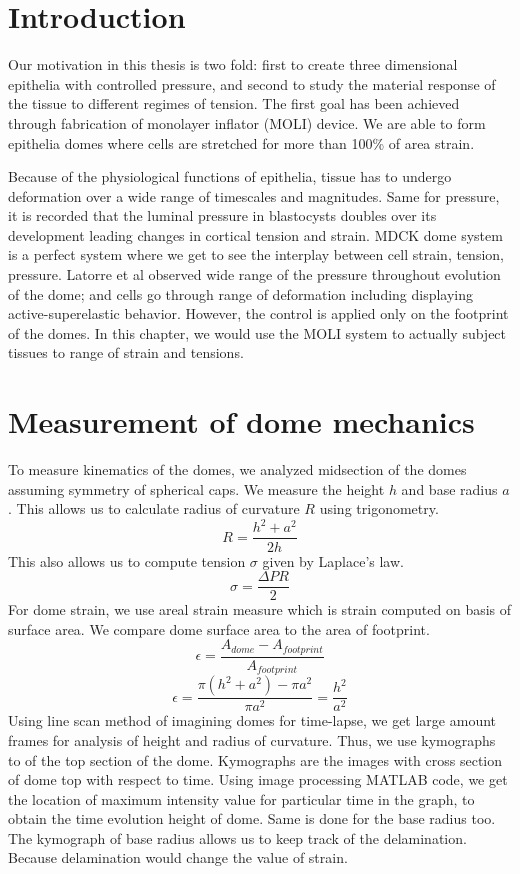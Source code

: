 \hypertarget{introduction}{%
\section{Introduction}\label{introduction2}}

Our motivation in this thesis is two fold: first to create three
dimensional epithelia with controlled pressure, and second to study the
material response of the tissue to different regimes of tension. The
first goal has been achieved through fabrication of monolayer inflator
(MOLI) device. We are able to form epithelia domes where cells are
stretched for more than 100\% of area strain.

Because of the physiological functions of epithelia, tissue has to
undergo deformation over a wide range of timescales and magnitudes. Same
for pressure, it is recorded that the luminal pressure in blastocysts
doubles over its development leading changes in cortical tension and
strain. MDCK dome system is a perfect system where we get to see the
interplay between cell strain, tension, pressure. Latorre et al observed
wide range of the pressure throughout evolution of the dome; and cells
go through range of deformation including displaying active-superelastic
behavior. However, the control is applied only on the footprint of the
domes. In this chapter, we would use the MOLI system to actually subject
tissues to range of strain and tensions.

\hypertarget{measurement-of-dome-mechanics}{%
\section{Measurement of dome
mechanics}\label{measurement-of-dome-mechanics}}

To measure kinematics of the domes, we analyzed midsection of the domes
assuming symmetry of spherical caps. We measure the height \(h\) and
base radius \(a\). This allows us to calculate radius of curvature \(R\)
using trigonometry. \[ R = \frac{h^2 + a^2}{2h} \] This also allows us
to compute tension \(\sigma\) given by Laplace's law.
\[\sigma = \frac{\Delta PR }{2}\] For dome strain, we use areal strain
measure which is strain computed on basis of surface area. We compare
dome surface area to the area of footprint.
\[ \epsilon = \frac{A_{dome } - A_{footprint}}{A_{footprint}} \]
\[ \epsilon = \frac{\pi(h^2 + a^2) - \pi a^2}{\pi a^2} = \frac{h^2}{a^2}\]
Using line scan method of imagining domes for time-lapse, we get large
amount frames for analysis of height and radius of curvature. Thus, we
use kymographs to of the top section of the dome. Kymographs are the
images with cross section of dome top with respect to time. Using image
processing MATLAB code, we get the location of maximum intensity value
for particular time in the graph, to obtain the time evolution height of
dome. Same is done for the base radius too. The kymograph of base radius
allows us to keep track of the delamination. Because delamination would
change the value of strain.

